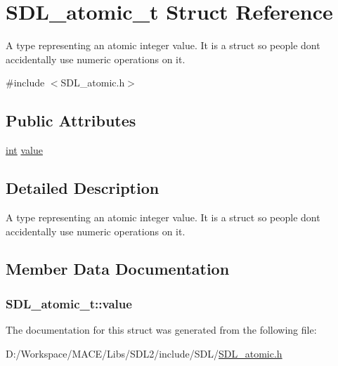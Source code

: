 \hypertarget{struct_s_d_l__atomic__t}{}\section{S\+D\+L\+\_\+atomic\+\_\+t Struct Reference}
\label{struct_s_d_l__atomic__t}


A type representing an atomic integer value. It is a struct so people don\textquotesingle{}t accidentally use numeric operations on it.  




{\ttfamily \#include $<$S\+D\+L\+\_\+atomic.\+h$>$}

\subsection*{Public Attributes}
\begin{DoxyCompactItemize}
\item 
\hyperlink{_s_d_l__thread_8h_a6a64f9be4433e4de6e2f2f548cf3c08e}{int} \hyperlink{struct_s_d_l__atomic__t_a0d09ddf3cc5798c709edb7cea104203a}{value}
\end{DoxyCompactItemize}


\subsection{Detailed Description}
A type representing an atomic integer value. It is a struct so people don\textquotesingle{}t accidentally use numeric operations on it. 

\subsection{Member Data Documentation}
\subsubsection[{\texorpdfstring{value}{value}}]{ S\+D\+L\+\_\+atomic\+\_\+t\+::value}\hypertarget{struct_s_d_l__atomic__t_a0d09ddf3cc5798c709edb7cea104203a}{}\label{struct_s_d_l__atomic__t_a0d09ddf3cc5798c709edb7cea104203a}


The documentation for this struct was generated from the following file\+:\begin{DoxyCompactItemize}
\item 
D\+:/\+Workspace/\+M\+A\+C\+E/\+Libs/\+S\+D\+L2/include/\+S\+D\+L/\hyperlink{_s_d_l__atomic_8h}{S\+D\+L\+\_\+atomic.\+h}\end{DoxyCompactItemize}
